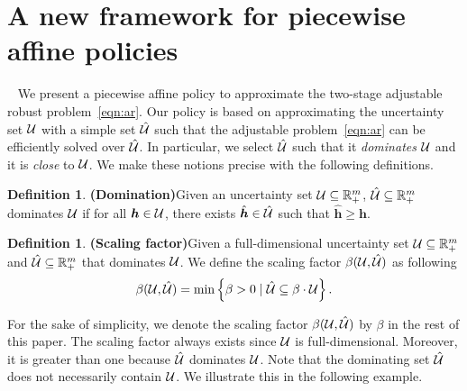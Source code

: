 \documentclass[11pt]{article}
\theoremstyle{plain}
\theoremstyle{definition}
\newtheorem{definition}[theorem]{Definition}
\numberwithin{equation}{section}%
\numberwithin{equation}{section}%
\newcommand{\mb}[1]{\ensuremath{\boldsymbol{#1}}}
\begin{document}

\section{A new framework for piecewise affine policies}~\label{sec:framework}
We present a piecewise affine policy to approximate the two-stage adjustable robust problem~\eqref{eqn:ar}. Our policy is based on approximating the uncertainty set ${\cal U}$ with a simple set $\hat{\cal U}$ such that the adjustable  problem~\eqref{eqn:ar} can be efficiently solved over $\hat{\cal U}$. In particular, we select $\hat{\cal U}$  such that it  {\em dominates} ${\cal U}$ and it is {\em close} to ${\cal U}$. We make these notions precise with the following definitions.

\begin{definition} {\bf (Domination)}\label{Domination}
Given an uncertainty set ${\cal U}\subseteq{\mathbb R}^{m}_+$, $\hat{{\cal U}}\subseteq{\mathbb R}^{m}_+$ dominates ${\cal U}$ if for all
$\mb{h}\in {\cal U}$, there exists $\hat{\mb{h}}\in\hat{\cal U}$ such that $\hat{\mb{h}}\geq\mb{h}$.
\end{definition}

\begin{definition} {\bf (Scaling factor)}\label{def:scaling-factor}
Given a full-dimensional uncertainty set ${\cal U}\subseteq{\mathbb R}^{m}_+$ and $\hat{\cal U}\subseteq{\mathbb R}^{m}_+$ that dominates ${\cal U}$. We define the scaling factor $\beta ({\cal U},\hat{{\cal U}})$  as following
\[\beta ({\cal U},\hat{{\cal U}})= \min \left\{ \beta >0 \; |\;\hat{\cal U} \subseteq  \beta \cdot {\cal U} \right\} .\]
\end{definition}

For the sake of simplicity, we denote the scaling factor $\beta ({\cal U},\hat{{\cal U}})$ by $\beta$ in the rest of this paper. The scaling factor always exists since ${\cal U}$ is full-dimensional. Moreover, it is greater than one because $\hat{\cal U}$ dominates ${\cal U}$.
Note that the dominating set $\hat{\cal U}$ does not necessarily contain ${\cal U}$. We illustrate this in the following example.
\end{document}
